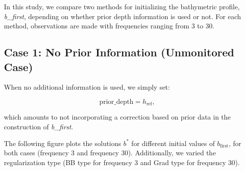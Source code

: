 \documentclass{article}
\begin{document}
In this study, we compare two methods for initializing the bathymetric profile, \emph{b\_first}, depending on whether prior depth information is used or not. For each method, observations are made with frequencies ranging from 3 to 30.

\subsection{Case 1: No Prior Information (Unmonitored Case)}

When no additional information is used, we simply set:

\[
\text{prior\_depth} = h_{\text{ref}},
\]

which amounts to not incorporating a correction based on prior data in the construction of \emph{b\_first}.

The following figure plots the solutions \( b^* \) for different initial values of \( b_{\text{first}} \), for both cases (frequency 3 and frequency 30). Additionally, we varied the regularization type (BB type for frequency 3 and Grad type for frequency 30).
\end{document}
